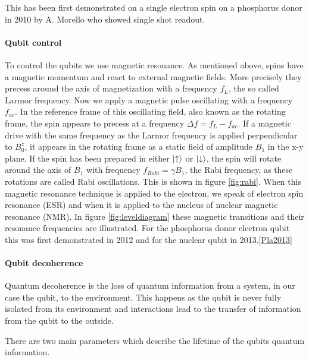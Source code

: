 This has been first demonstrated on a single electron spin on a phosphorus donor in 2010 by A. Morello who showed single shot readout.\cite{Morello2010}

\paragraph*{Qubit control} \label{sec:qubit_control}
To control the qubits we use magnetic resonance. As mentioned above, spins have a magnetic momentum and react to external magnetic fields. More precisely they precess around the axis of magnetization with a frequency $f_L$, the so called Larmor frequency. Now we apply a magnetic pulse oscillating with a frequency $f_{ac}$. In the reference frame of this oscillating  field, also known as the rotating frame, the spin appears to precess at a frequency $\Delta f=f_L-f_{ac}$.  If a magnetic drive with the same frequency as the Larmor frequency is applied perpendicular to $B_0^z$, it appears in the rotating frame as a static field of amplitude $B_1$ in the x-y plane. If the spin has been prepared in either $\ket{\uparrow}$ or $\ket{\downarrow}$, the spin will rotate around the axis of $B_1$ with frequency $f_{Rabi}=\gamma B_1$, the Rabi frequency, as these rotations are called Rabi oscillations. This is shown in figure \ref{fig:rabi}. 
When this magnetic resonance technique is applied to the electron, we speak of electron spin resonance (ESR) and when it is applied to the nucleus of nuclear magnetic resonance (NMR).
In figure \ref{fig:leveldiagram} these magnetic transitions and their resonance frequencies are illustrated. 
For the phosphorus donor electron qubit this was first demonstrated in 2012\cite{Pla2012} and for the nuclear qubit in 2013.\ref{Pla2013}



\paragraph*{Qubit decoherence} \label{sec:decoherence}

Quantum decoherence is the loss of quantum information from a system, in our case the qubit, to the environment.
This happens as the qubit is never fully isolated from its environment and interactions lead to the transfer of information from the qubit to the outside. 

There are two main parameters which describe the lifetime of the qubits quantum information. 

